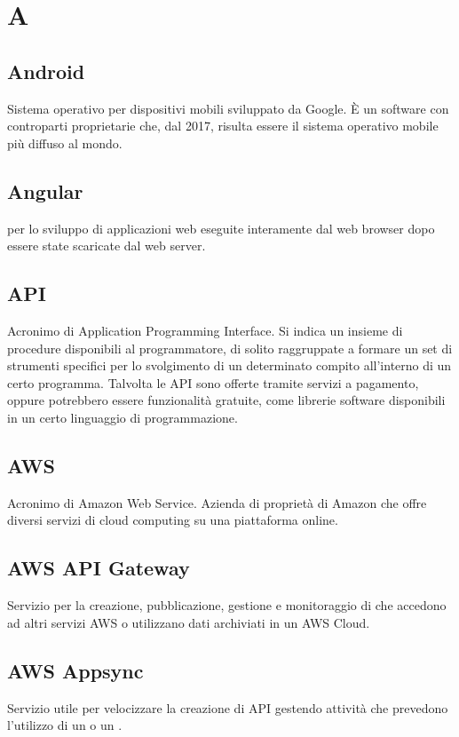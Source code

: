 \section*{A}
\markright{}

\subsection*{Android}
Sistema operativo per dispositivi mobili sviluppato da Google. È un software  con controparti proprietarie che, dal 2017, risulta essere il sistema operativo mobile più diffuso al mondo. 
 
\subsection*{Angular}
  per lo sviluppo di applicazioni web eseguite interamente dal web browser dopo essere state scaricate dal web server.

\subsection*{API}
Acronimo di Application Programming Interface. Si indica un  insieme  di  procedure disponibili al programmatore, di solito  raggruppate a formare un set di strumenti specifici per lo svolgimento di un determinato compito all'interno di un certo programma. Talvolta le API sono offerte tramite servizi a pagamento, oppure potrebbero essere funzionalità gratuite, come librerie software disponibili in un certo linguaggio di programmazione.

\subsection*{AWS}
Acronimo di Amazon Web Service. Azienda di proprietà di Amazon che offre diversi servizi di cloud computing su una piattaforma online.

\subsection*{AWS API Gateway}
Servizio  per la creazione, pubblicazione, gestione e monitoraggio di  che accedono ad altri servizi AWS o utilizzano dati archiviati in un AWS Cloud.

\subsection*{AWS Appsync}
Servizio  utile per velocizzare la creazione di API gestendo attività che prevedono l'utilizzo di un  o un .

